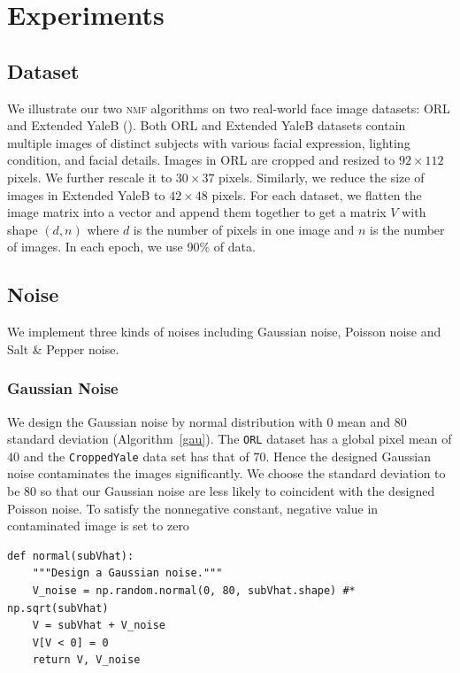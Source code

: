 \section{Experiments}\label{chapter4}

\subsection{Dataset}
We illustrate our two \textsc{nmf} algorithms on two real-world face image datasets: ORL and Extended YaleB (\citet{belhumeur1997eigenfaces}). 
Both ORL and Extended YaleB datasets contain multiple images of distinct subjects with various facial expression, lighting condition, and facial details. 
Images in ORL are cropped and resized to $92 \times 112$ pixels. We further rescale it to $30 \times 37$ pixels. Similarly, we reduce the size of images in Extended YaleB to $42 \times 48$ pixels.
For each dataset, we flatten the image matrix into a vector and append them together to get a matrix $V$ with shape $(d, n)$ where $d$ is the number of pixels in one image and $n$ is the number of images. In each epoch, we use 90\% of data. 

\subsection{Noise}
We implement three kinds of noises including Gaussian noise, Poisson noise and Salt \& Pepper noise.
\subsubsection{Gaussian Noise}\label{sec:gau}
We design the Gaussian noise by normal distribution with $0$ mean and $80$ standard deviation (Algorithm~\ref{gau}). The \texttt{ORL} dataset has a global pixel mean of $40$ and the \texttt{CroppedYale} data set has that of $70$. Hence the designed Gaussian noise contaminates the images significantly. We choose the standard deviation to be $80$ so that our Gaussian noise are less likely to coincident with the designed Poisson noise. To satisfy the nonnegative constant, negative value in contaminated image is set to zero
\begin{lstlisting}[caption= Gaussian Noise Design, label=gau]
def normal(subVhat):
    """Design a Gaussian noise."""
    V_noise = np.random.normal(0, 80, subVhat.shape) #* np.sqrt(subVhat)
    V = subVhat + V_noise
    V[V < 0] = 0
    return V, V_noise
\end{lstlisting}


